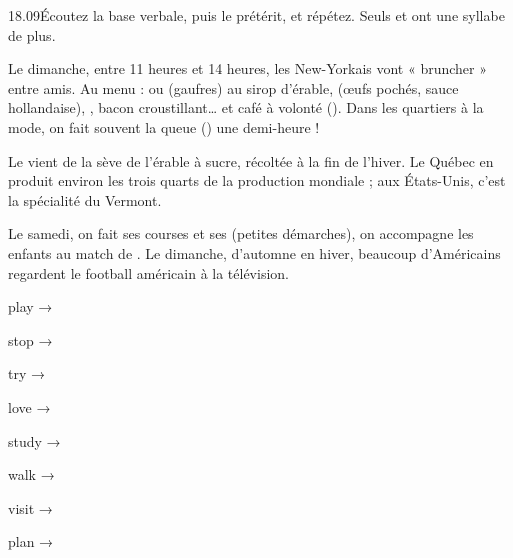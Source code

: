 \begin{paires}{18.09}{Écoutez la base verbale, puis le prétérit, et répétez. Seuls  et
 ont une syllabe de plus.}
\end{paires}


\begin{culture}[\en{Breakfast} + \en{lunch} = \en{brunch}]
Le dimanche, entre 11 heures et 14 heures, les New-Yorkais vont « bruncher » entre amis. Au menu :
 ou  (gaufres) au sirop d'érable,  (œufs pochés, sauce
hollandaise), , bacon croustillant… et café à volonté (). Dans les quartiers à
la mode, on fait souvent la queue () une demi-heure !
\end{culture}

\begin{paire}
\begin{culture}
Le  vient de la sève de l'érable à sucre, récoltée à la fin de l'hiver. Le Québec en
produit environ les trois quarts de la production mondiale ; aux États-Unis, c'est la spécialité du
Vermont.
\end{culture}
\begin{culture}
Le samedi, on fait ses courses et ses  (petites démarches), on accompagne les enfants au
match de . Le dimanche, d'automne en hiver, beaucoup d'Américains regardent le football
américain à la télévision.
\end{culture}
\end{paire}


\begin{anglais}
\begin{questions}[4]
\item play → 
\item stop → 
\item try → 
\item love → 
\item study → 
\item walk → 
\item visit → 
\item plan → 
\end{questions}
\end{anglais}

